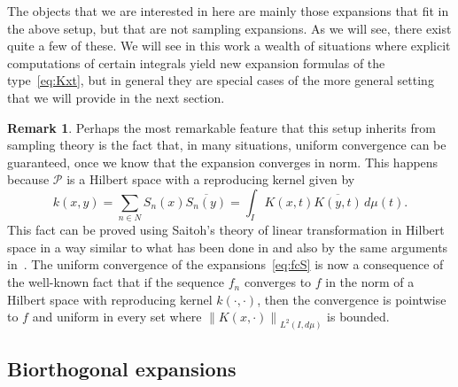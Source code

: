 \documentclass[11pt,a4paper]{amsart}
\theoremstyle{plain}
\theoremstyle{definition}
\newtheorem{Rem}{Remark}
\newcommand{\calP}{\mathcal{P}}
\begin{document}
The objects that we are interested in here are mainly those expansions that
fit in the above setup, but that are not sampling expansions. As we
will see, there exist quite a few of these. We will see in this work a
wealth of situations where explicit computations of certain integrals yield
new expansion formulas of the type~\eqref{eq:Kxt}, but in general they are special
cases of the more general setting that we will provide in the next section.

\begin{Rem}
\label{rem:unifconv}
Perhaps the most remarkable feature that this setup
inherits from sampling theory is the fact that, in many situations, uniform
convergence can be guaranteed, once we know that the expansion converges in
norm. This happens because $\calP$ is a Hilbert space with a reproducing
kernel given by
\begin{equation*}
  k(x,y) = \sum_{n\in N}S_{n}(x)\overline{S_{n}(y)}
  = \int_{I}K(x,t)\overline{K(y,t)}\,d\mu(t).
\end{equation*}
This fact can be proved using Saitoh's theory of linear transformation
in Hilbert space \cite{Sa, S-book} in a
way similar to what has been done in \cite{Abr} and also by the same
arguments in~\cite{Garcia}. The uniform convergence of the
expansions~\eqref{eq:fcS} is now a consequence of the well-known fact that if 
the sequence $f_{n}$ converges to $f$ in the norm of a Hilbert space with
reproducing kernel $k(\cdot,\cdot)$, then the convergence is pointwise to $f$
and uniform in every set where
$\left\|K(x,\cdot)\right\|_{L^{2}(I,d\mu)}$ is bounded.
\end{Rem}

\subsection{Biorthogonal expansions}
\label{sub:biorthogonal}
\end{document}
